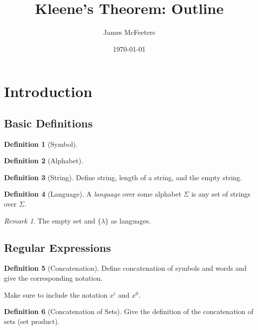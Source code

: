 \documentclass[12 pt, twoside, letterpaper]{article}
\title{Kleene's Theorem: Outline}
\author{James McFeeters}
\date{\today}
\newcommand{\meo}[1]{#1}
\theoremstyle{definition}
\newtheorem{definition}{Definition}
\theoremstyle{remark}
\newtheorem*{remark}{Remark}
\theoremstyle{plain}
\begin{document}
\maketitle

\section{Introduction} %
\label{sec:introduction}

	\subsection{Basic Definitions} %
	\label{sub:basic_definitions}

		\begin{definition}[Symbol]
			
		\end{definition}

		\begin{definition}[Alphabet]

		\end{definition}

		\begin{definition}[String]
			Define string, length of a string, and the empty string.
		\end{definition}

		\begin{definition}[Language]
			A \textit{language} over some alphabet $\Sigma$ is any set of strings over $\Sigma$.
		\end{definition}

		\begin{remark}
			The empty set and $\{ \lambda \}$ as languages.
		\end{remark}

	\subsection{Regular Expressions} %
	\label{sub:regular_expressions}
		
		\begin{definition}[Concatenation]
			Define concatenation of symbols and words and give the corresponding notation.
			\meo{
				Make sure to include the notation $x^i$ and $x^0$.
			}
		\end{definition}

		\begin{definition}[Concatenation of Sets]
			Give the definition of the concatenation of sets (set product). 
		\end{definition}
\end{document}

